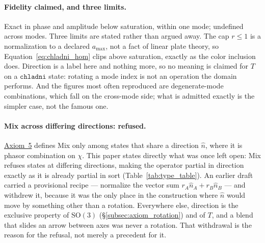 \documentclass[12pt, a4paper]{article}
\begin{document}
\paragraph{Fidelity claimed, and three limits.}
Exact in phase and amplitude below saturation, within one mode;
undefined across modes. Three limits are stated rather than argued
away. The cap $r\le 1$ is a normalization to a declared $a_{\max}$,
not a fact of linear plate theory, so
Equation~\eqref{eq:chladni_hom} clips above saturation, exactly as the
color inclusion does. Direction is a label here and nothing more,
so no meaning is claimed for $T$ on a $\mathtt{chladni}$ state:
rotating a mode index is not an operation the domain performs. And the
figures most often reproduced are degenerate-mode combinations, which
fall on the cross-mode side; what is admitted exactly is the simpler
case, not the famous one.

\paragraph{Mix across differing directions: refused.}
\label{subsec:mix_scattered_open}
\hyperref[subsec:axiom_interference]{Axiom~5} defines Mix only among states
that share a direction $\hat n$, where it is phasor combination on
$\chi$. This paper states directly what was once left open: Mix
refuses states at differing directions, making the operator partial
in direction exactly as it is already partial in sort
(Table~\ref{tab:type_table}). An earlier draft carried a provisional
recipe --- normalize the vector sum $r_A\hat n_A+r_B\hat n_B$ --- and
withdrew it, because it was the only place in the construction where
$\hat n$ would move by something other than a rotation. Everywhere
else, direction is the exclusive property of $\mathrm{SO}(3)$
(\S\ref{subsec:axiom_rotation}) and of $T$, and a blend that slides
an arrow between axes was never a rotation. That withdrawal is the
reason for the refusal, not merely a precedent for it.
\end{document}
